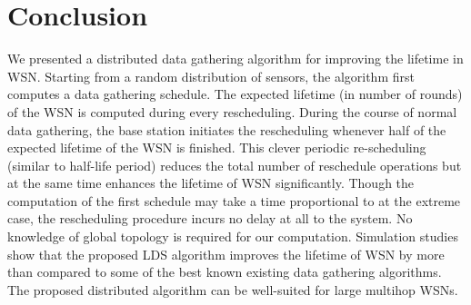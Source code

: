 \documentclass[10pt]{llncs}
\begin{document}
\section{Conclusion}

We presented a distributed data gathering algorithm for improving the lifetime in WSN. Starting from a random distribution of  sensors, the algorithm first computes a data gathering schedule. The expected lifetime (in number of rounds) of the WSN is computed during every rescheduling. During the course of normal data gathering, the base station initiates the rescheduling whenever half of the expected lifetime of the WSN is finished. This clever periodic re-scheduling (similar to half-life period) reduces the total number of reschedule operations but at the same time enhances the lifetime of WSN significantly. Though the computation of the first schedule may take a time proportional to  at the extreme case, the rescheduling procedure incurs no delay at all to the system. No knowledge of global topology is required for our computation. Simulation studies show that the proposed LDS algorithm improves the lifetime of WSN by more than  compared to some of the best known existing data gathering algorithms. The proposed distributed algorithm can be  well-suited for large multihop WSNs.



\end{document}
